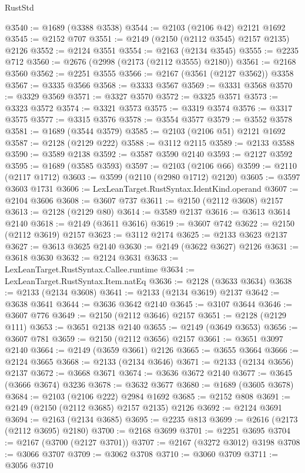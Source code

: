 \begin{lexlean}{RustStd}
\begin{coremodule}
{\begin{coremodule}
{{{{{{{{{{{{{{{{@3540 := @1689 (@3388 @3538)
@3544 := @2103 (@2106 @42) @2121 @1692
@3545 := @2152 @707
@3551 := @2149 (@2150 (@2112 @3545) @2157 @2135) @2126
@3552 := @2124 @3551
@3554 := @2163 (@2134 @3545)
@3555 := @2235 @712
@3560 := @2676 (@2998 (@2173 (@2112 @3555) @2180))
@3561 := @2168 @3560
@3562 := @2251 @3555
@3566 := @2167 (@3561 (@2127 @3562)) @3358
@3567 := @3335 @3566
@3568 := @3333 @3567
@3569 := @3331 @3568
@3570 := @3329 @3569
@3571 := @3327 @3570
@3572 := @3325 @3571
@3573 := @3323 @3572
@3574 := @3321 @3573
@3575 := @3319 @3574
@3576 := @3317 @3575
@3577 := @3315 @3576
@3578 := @3554 @3577
@3579 := @3552 @3578
@3581 := @1689 (@3544 @3579)
@3585 := @2103 (@2106 @51) @2121 @1692
@3587 := @2128 (@2129 @222)
@3588 := @3112 @2115
@3589 := @2133 @3588
@3590 := @3589 @2138
@3592 := @3587 @3590 @2140
@3593 := @2127 @3592
@3595 := @1689 (@3585 @3593)
@3597 := @2103 (@2106 @66)
@3599 := @2110 (@2117 @1712)
@3603 := @3599 (@2110 (@2980 @1712) @2120)
@3605 := @3597 @3603 @1731
@3606 := LexLeanTarget.RustSyntax.IdentKind.operand
@3607 := @2104 @3606
@3608 := @3607 @737
@3611 := @2150 (@2112 @3608) @2157
@3613 := @2128 (@2129 @80)
@3614 := @3589 @2137
@3616 := @3613 @3614 @2140
@3618 := @2149 (@3611 @3616)
@3619 := @3607 @742
@3622 := @2150 (@2112 @3619) @2157
@3623 := @3112 @2174
@3625 := @2133 @3623 @2137
@3627 := @3613 @3625 @2140
@3630 := @2149 (@3622 @3627) @2126
@3631 := @3618 @3630
@3632 := @2124 @3631
@3633 := LexLeanTarget.RustSyntax.Callee.runtime
@3634 := LexLeanTarget.RustSyntax.Item.natEq
@3636 := @2128 (@3633 @3634)
@3638 := @2133 (@2134 @3608)
@3641 := @2133 (@2134 @3619) @2137
@3642 := @3638 @3641
@3644 := @3636 @3642 @2140
@3645 := @3107 @3644
@3646 := @3607 @776
@3649 := @2150 (@2112 @3646) @2157
@3651 := @2128 (@2129 @111)
@3653 := @3651 @2138 @2140
@3655 := @2149 (@3649 @3653)
@3656 := @3607 @781
@3659 := @2150 (@2112 @3656) @2157
@3661 := @3651 @3097 @2140
@3664 := @2149 (@3659 @3661) @2126
@3665 := @3655 @3664
@3666 := @2124 @3665
@3668 := @2133 (@2134 @3646)
@3671 := @2133 (@2134 @3656) @2137
@3672 := @3668 @3671
@3674 := @3636 @3672 @2140
@3677 := @3645 (@3666 @3674) @3236
@3678 := @3632 @3677
@3680 := @1689 (@3605 @3678)
@3684 := @2103 (@2106 @222) @2984 @1692
@3685 := @2152 @808
@3691 := @2149 (@2150 (@2112 @3685) @2157 @2135) @2126
@3692 := @2124 @3691
@3694 := @2163 (@2134 @3685)
@3695 := @2235 @813
@3699 := @2616 (@2173 (@2112 @3695) @2180)
@3700 := @2168 @3699
@3701 := @2251 @3695
@3704 := @2167 (@3700 (@2127 @3701))
@3707 := @2167 (@3272 @3012) @3198
@3708 := @3066 @3707
@3709 := @3062 @3708
@3710 := @3060 @3709
@3711 := @3056 @3710
}}}}}}}}}}}}}}}}
\end{coremodule}}
\end{coremodule}
\end{lexlean}
